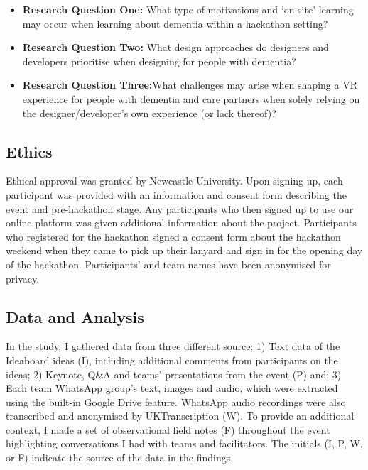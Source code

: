 \begin{itemize}
    \item \textbf{Research Question One:} What type of motivations and ‘on-site’ learning may occur when learning about dementia within a hackathon setting?
    \item \textbf{Research Question Two:} What design approaches do designers and developers prioritise when designing for people with dementia?
    \item \textbf{Research Question Three:}What challenges may arise when shaping a VR experience for people with dementia and care partners when solely relying on the designer/developer’s own experience (or lack thereof)?
\end{itemize}

\subsection{Ethics}
\label{sec:Ethics}
Ethical approval was granted by Newcastle University. Upon signing up, each participant was provided with an information and consent form describing the event and pre-hackathon stage. Any participants who then signed up to use our online platform was given additional information about the project. Participants who registered for the hackathon signed a consent form about the hackathon weekend when they came to pick up their lanyard and sign in for the opening day of the hackathon. Participants’ and team names have been anonymised for privacy.

\subsection{Data and Analysis}
\label{sec:DataAnalysis}
In the study, I gathered data from three different source: 1) Text data of the Ideaboard ideas (I), including additional comments from participants on the ideas; 2) Keynote, Q\&A and teams’ presentations from the event (P) and; 3) Each team WhatsApp group’s text, images and audio, which were extracted using the built-in Google Drive feature. WhatsApp audio recordings were also transcribed and anonymised by UKTranscription (W). To provide an additional context, I made a set of observational field notes (F) throughout the event highlighting conversations I had with teams and facilitators. The initials (I, P, W, or F) indicate the source of the data in the findings.

